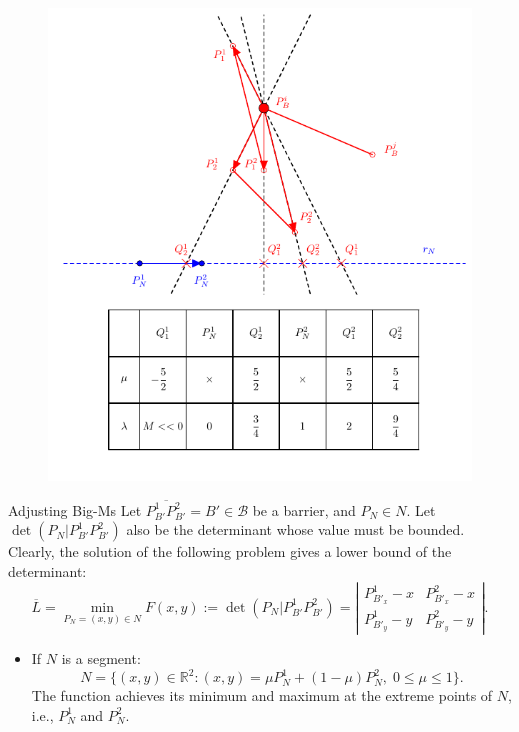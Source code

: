 \documentclass[slidestop,usepdftitle=false,10pt]{beamer}
\newcommand{\B}{{\mathcal B}}
\newcommand{\determinant}[3]{\det({#1|#2#3})}
\begin{document}
	\begin{frame}
		\begin{figure}
			\includegraphics[width=0.6\linewidth]{example_preprocessing_htspn}
		\end{figure}
	\end{frame}

	\begin{frame}{Adjusting Big-Ms}
		Let $\overline{P^1_{B'}P^2_{B'}}=B'\in\B$ be a barrier, and $P_N\in N$. Let $\determinant{P_N}{P_{B'}^1}{P_{B'}^2}$ also be the determinant whose value must be bounded. Clearly, the solution of the following problem gives a lower bound of the determinant:
		\begin{equation*}\label{eq:L-Problem}
			\overline{L}=\min_{P_N=(x,y)\in N}F(x,y):=\determinant{P^{}_N}{P_{B'}^1}{P_{B'}^2}=\left|
			\begin{array}{cc}
				P^{1}_{B'_x}-x & P^{2}_{B'_x}-x \\
				P^{1}_{B'_y}-y & P^{2}_{B'_y}-y
			\end{array}
			\right|.
		\end{equation*}
		\begin{itemize}
			\item If $N$ is a segment:
				$$N=\{(x,y)\in\mathbb R^2:(x,y)=\mu P^1_{N}+(1-\mu)P^2_{N}, \; 0\leq\mu\leq1\}.$$
				The function achieves its minimum and maximum at the extreme points of $N$, i.e., $P_N^1$ and $P_N^2$.
		\end{itemize}
	\end{frame}
\end{document}
